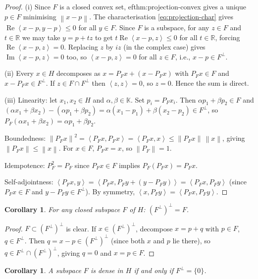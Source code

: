 \documentclass[a4paper,12pt]{book}
\newcommand{\R}{\mathbb{R}}
\newcommand{\K}{\mathbb{K}}
\newcommand{\norm}[1]{\left\| #1 \right\|}
\newcommand{\inner}[2]{\left\langle #1, #2 \right\rangle}
\theoremstyle{definition}
\theoremstyle{plain}
\newtheorem{corollary}[definition]{Corollary}
\theoremstyle{remark}
\begin{document}
\begin{proof}
(i) Since $F$ is a closed convex set, 
ef{thm:projection-convex}
gives a unique $p\in F$ minimising $\norm{x-p}$.  The characterisation
\eqref{eq:projection-char} gives
$\operatorname{Re}\inner{x-p}{y-p}\le 0$ for all $y\in F$.
Since $F$ is a subspace, for any $z\in F$ and $t\in\R$ we may take
$y=p+tz$ to get
$t\operatorname{Re}\inner{x-p}{z}\le 0$ for all $t\in\R$, forcing
$\operatorname{Re}\inner{x-p}{z}=0$.
Replacing $z$ by $iz$ (in the complex case) gives
$\operatorname{Im}\inner{x-p}{z}=0$ too, so $\inner{x-p}{z}=0$
for all $z\in F$, i.e., $x-p\in F^\perp$.

(ii)  Every $x\in H$ decomposes as $x = P_F x + (x-P_F x)$ with
$P_F x\in F$ and $x-P_F x\in F^\perp$.  If $z\in F\cap F^\perp$ then
$\inner{z}{z}=0$, so $z=0$.  Hence the sum is direct.

(iii)  Linearity: let $x_1,x_2\in H$ and $\alpha,\beta\in\K$.
Set $p_i=P_Fx_i$.  Then $\alpha p_1+\beta p_2\in F$ and
$(\alpha x_1+\beta x_2)-(\alpha p_1+\beta p_2)=\alpha(x_1-p_1)+\beta(x_2-p_2)\in F^\perp$,
so $P_F(\alpha x_1+\beta x_2)=\alpha p_1+\beta p_2$.

Boundedness: $\norm{P_Fx}^2=\inner{P_Fx}{P_Fx}=\inner{P_Fx}{x}\le\norm{P_Fx}\,\norm{x}$,
giving $\norm{P_Fx}\le\norm{x}$.  For $x\in F$, $P_Fx=x$, so $\norm{P_F}=1$.

Idempotence: $P_F^2=P_F$ since $P_Fx\in F$ implies $P_F(P_Fx)=P_Fx$.

Self-adjointness:
$\inner{P_Fx}{y}=\inner{P_Fx}{P_Fy+(y-P_Fy)}=\inner{P_Fx}{P_Fy}$
(since $P_Fx\in F$ and $y-P_Fy\in F^\perp$).  By symmetry,
$\inner{x}{P_Fy}=\inner{P_Fx}{P_Fy}$.
\end{proof}

\begin{corollary}
\label{cor:perp-perp}
For any closed subspace $F$ of $H$: $(F^\perp)^\perp = F$.
\end{corollary}

\begin{proof}
$F\subset(F^\perp)^\perp$ is clear.  If $x\in(F^\perp)^\perp$, decompose
$x=p+q$ with $p\in F$, $q\in F^\perp$.  Then
$q=x-p\in(F^\perp)^\perp$ (since both $x$ and $p$ lie there), so
$q\in F^\perp\cap(F^\perp)^\perp$, giving $q=0$ and $x=p\in F$.
\end{proof}

\begin{corollary}
\label{cor:dense-perp}
A subspace $F$ is dense in $H$ if and only if $F^\perp=\{0\}$.
\end{corollary}
\end{document}
